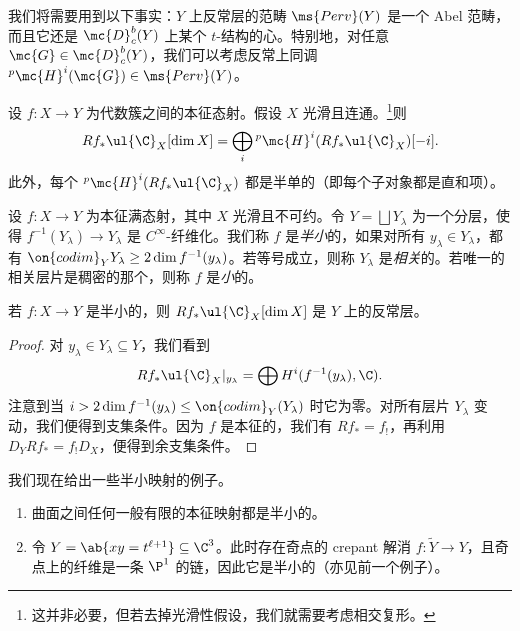 我们将需要用到以下事实：\(Y\) 上反常层的范畴 \(\ms{Perv}(Y)\) 是一个 Abel 范畴，而且它还是 \(\mc{D}_c^b(Y)\) 上某个 \(t\)-结构的心。特别地，对任意 \(\mc{G} \in \mc{D}_c^b (Y)\)，我们可以考虑反常上同调 \(^p\mc{H}^i(\mc{G}) \in \ms{Perv}(Y)\)。

\begin{thm}
    设 \(f \colon X \to Y\) 为代数簇之间的本征态射。假设 \(X\) 光滑且连通。\footnote{这并非必要，但若去掉光滑性假设，我们就需要考虑相交复形。}则
    \[ R f_* \ul{\C}_X [\dim X] = \bigoplus_{i} {^p\mc{H}^i}(R f_* \ul{\C}_X)[-i]. \]
    此外，每个 \(^p\mc{H}^i (R f_* \ul{\C}_X)\) 都是半单的（即每个子对象都是直和项）。
\end{thm}

\begin{defn}
    设 \(f \colon X \to Y\) 为本征满态射，其中 \(X\) 光滑且不可约。令 \(Y = \bigsqcup Y_{\lambda}\) 为一个分层，使得 \(f^{-1}(Y_{\lambda}) \to Y_{\lambda}\) 是 \(C^{\infty}\)-纤维化。我们称 \(f\) 是\textit{半小}的，如果对所有 \(y_{\lambda} \in Y_{\lambda}\)，都有 \(\on{codim}_Y Y_{\lambda} \geq 2 \dim f^{-1} (y_{\lambda})\)。若等号成立，则称 \(Y_{\lambda}\) 是\textit{相关}的。若唯一的相关层片是稠密的那个，则称 \(f\) 是\textit{小}的。
\end{defn}

\begin{thm}
    若 \(f \colon X \to Y\) 是半小的，则 \(R f_* \ul{\C}_X [\dim X]\) 是 \(Y\) 上的反常层。
\end{thm}

\begin{proof}
    对 \(y_{\lambda} \in Y_{\lambda} \subseteq Y\)，我们看到
    \[ R f_* \ul{\C}_X |_{y_{\lambda}} = \bigoplus H^i (f^{-1}(y_{\lambda}), \C). \]
    注意到当 \(i > 2 \dim f^{-1}(y_{\lambda}) \leq \on{codim}_Y (Y_{\lambda})\) 时它为零。对所有层片 \(Y_{\lambda}\) 变动，我们便得到支集条件。因为 \(f\) 是本征的，我们有 \(R f_* = f_!\)，再利用 \(D_Y R f_* = f_! D_X\)，便得到余支集条件。
\end{proof}

\begin{exms}
    我们现在给出一些半小映射的例子。
    \begin{enumerate}
        \item 曲面之间任何一般有限的本征映射都是半小的。
        \item 令 \(Y = \ab\{xy = t^{\ell+1}\} \subseteq \C^3\)。此时存在奇点的 crepant 解消 \(f \colon \tilde{Y} \to Y\)，且奇点上的纤维是一条 \(\P^1\) 的链，因此它是半小的（亦见前一个例子）。
    \end{enumerate}
\end{exms}

